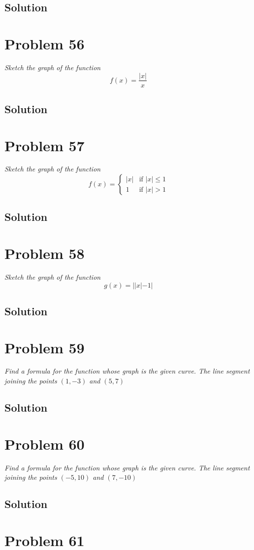 \documentclass[11pt]{article}
\newcommand{\soln}{\subsection*}
\newcommand{\qn}{\textit}
\begin{document}
\soln{Solution}

\section*{Problem 56}

\qn{Sketch the graph of the function $$f(x)=\frac{|x|}{x}$$}

\soln{Solution}

\section*{Problem 57}

\qn{Sketch the graph of the function}
\begin{equation}
	f(x)=
	\begin{cases}
		|x| & \text{if } |x| \le 1\\
		1 & \text{if } |x| > 1
	\end{cases}
\end{equation}

\soln{Solution}

\section*{Problem 58}

\qn{Sketch the graph of the function $$g(x)=||x|-1|$$}

\soln{Solution}

\section*{Problem 59}

\qn{Find a formula for the function whose graph is the given curve. The line segment joining the points $(1, -3)$ and $(5,7)$}

\soln{Solution}

\section*{Problem 60}

\qn{Find a formula for the function whose graph is the given curve. The line segment joining the points $(-5, 10)$ and $(7, -10)$}

\soln{Solution}

\section*{Problem 61}
\end{document}
